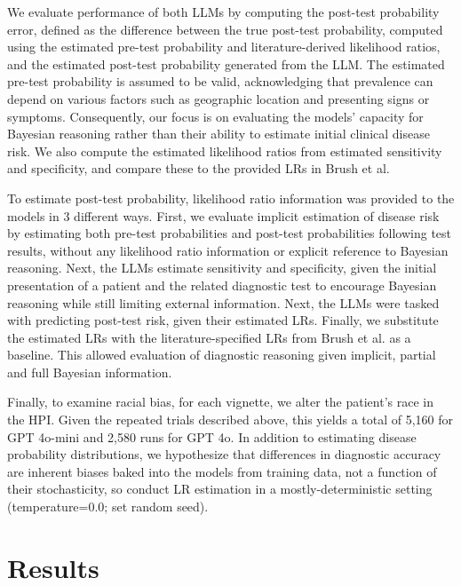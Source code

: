 We evaluate performance of both LLMs by computing the post-test probability error, defined as the difference between the true post-test probability, computed using the estimated pre-test probability and literature-derived likelihood ratios, and the estimated post-test probability generated from the LLM. The estimated pre-test probability is assumed to be valid, acknowledging that prevalence can depend on various factors such as geographic location and presenting signs or symptoms. Consequently, our focus is on evaluating the models' capacity for Bayesian reasoning rather than their ability to estimate initial clinical disease risk. We also compute the estimated likelihood ratios from estimated sensitivity and specificity, and compare these to the provided LRs in Brush et al. 

To estimate post-test probability, likelihood ratio information was provided to the models in 3 different ways. First, we evaluate implicit estimation of disease risk by estimating both pre-test probabilities and post-test probabilities following test results, without any likelihood ratio information or explicit reference to Bayesian reasoning. Next, the LLMs estimate sensitivity and specificity, given the initial presentation of a patient and the related diagnostic test to encourage Bayesian reasoning while still limiting external information. Next, the LLMs were tasked with predicting post-test risk, given their estimated LRs. Finally, we substitute the estimated LRs with the literature-specified LRs from Brush et al. as a baseline. This allowed evaluation of diagnostic reasoning given implicit, partial and full Bayesian information.

Finally, to examine racial bias, for each vignette, we alter the patient's race in the HPI. Given the repeated trials described above, this yields a total of 5,160 for GPT 4o-mini and 2,580 runs for GPT 4o. In addition to estimating disease probability distributions, we hypothesize that differences in diagnostic accuracy are inherent biases baked into the models from training data, not a function of their stochasticity, so conduct LR estimation in a mostly-deterministic setting (temperature=0.0; set random seed). 


\section{Results}

